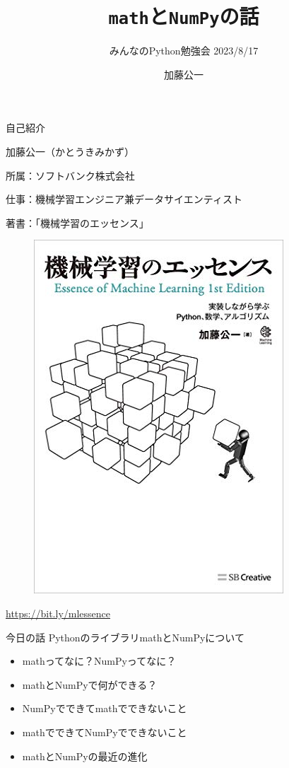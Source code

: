 \documentclass[unicode,lualatex,aspectratio=169]{beamer}
\title{{\tt math}と{\tt NumPy}の話}
\subtitle{みんなのPython勉強会 2023/8/17}
\date{}
\author{加藤公一}
\begin{document}
\begin{frame}
 \titlepage
\end{frame}
\begin{frame}[fragile]{自己紹介}
  
  加藤公一（かとうきみかず）

  所属：ソフトバンク株式会社

  仕事：機械学習エンジニア兼データサイエンティスト

  著書：「機械学習のエッセンス」

\begin{figure}[!ht]
  \includegraphics[scale=.2]{img/mlessence.jpeg}
\end{figure}
\begin{center}
  \url{https://bit.ly/mlessence}
\end{center}

\end{frame}
\begin{frame}[fragile]{今日の話}
  PythonのライブラリmathとNumPyについて
  \begin{itemize}
  \item mathってなに？NumPyってなに？
  \item mathとNumPyで何ができる？
  \item NumPyでできてmathでできないこと
  \item mathでできてNumPyでできないこと
  \item mathとNumPyの最近の進化
  \end{itemize}
\end{frame}
\end{document}
